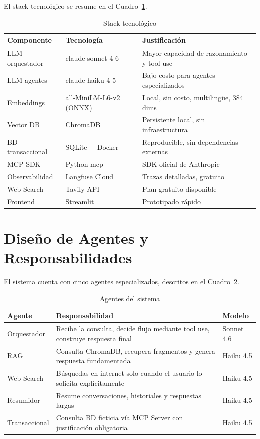 \documentclass[conference]{IEEEtran}
\begin{document}
El stack tecnológico se resume en el Cuadro~\ref{tab:stack}.

\begin{table}[htbp]
\caption{Stack tecnológico}
\label{tab:stack}
\begin{tabular}{@{}p{2.2cm}p{2.2cm}p{2.6cm}@{}}
\toprule
\textbf{Componente} & \textbf{Tecnología} & \textbf{Justificación} \\
\midrule
LLM orquestador & claude-sonnet-4-6 & Mayor capacidad de razonamiento y tool use \\
LLM agentes & claude-haiku-4-5 & Bajo costo para agentes especializados \cite{anthropic2024claude}\\
Embeddings & all-MiniLM-L6-v2 (ONNX) & Local, sin costo, multilingüe, 384 dims \\
Vector DB & ChromaDB & Persistente local, sin infraestructura \cite{chroma2023} \\
BD transaccional & SQLite + Docker & Reproducible, sin dependencias externas \\
MCP SDK & Python mcp & SDK oficial de Anthropic \\
Observabilidad & Langfuse Cloud & Trazas detalladas, gratuito \\
Web Search & Tavily API & Plan gratuito disponible \cite{tavily2024} \\
Frontend & Streamlit & Prototipado rápido \\
\bottomrule
\end{tabular}
\end{table}


\section{Diseño de Agentes y Responsabilidades}

El sistema cuenta con cinco agentes especializados, descritos en el Cuadro~\ref{tab:agentes}.

\begin{table}[htbp]
\caption{Agentes del sistema}
\label{tab:agentes}
\begin{tabular}{@{}p{1.8cm}p{3.8cm}p{1.4cm}@{}}
\toprule
\textbf{Agente} & \textbf{Responsabilidad} & \textbf{Modelo} \\
\midrule
Orquestador & Recibe la consulta, decide flujo mediante tool use, construye respuesta final & Sonnet 4.6 \\
\addlinespace
RAG & Consulta ChromaDB, recupera fragmentos y genera respuesta fundamentada & Haiku 4.5 \\
\addlinespace
Web Search & Búsquedas en internet solo cuando el usuario lo solicita explícitamente & Haiku 4.5 \\
\addlinespace
Resumidor & Resume conversaciones, historiales y respuestas largas & Haiku 4.5 \\
\addlinespace
Transaccional & Consulta BD ficticia vía MCP Server con justificación obligatoria & Haiku 4.5 \\
\bottomrule
\end{tabular}
\end{table}
\end{document}
